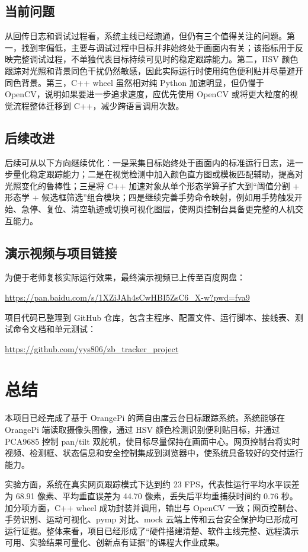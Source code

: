 \documentclass[
  oneside,
  degree=bachelor,
  field=science,
  fullwidthstop=circle,
  fontset=windows,
  times=false,
  minted=false,
  biblatex=false,
  algo=algpseudocode,
]{tongjithesis}
\begin{document}
\section{当前问题}

从回传日志和调试过程看，系统主线已经跑通，但仍有三个值得关注的问题。第一，找到率偏低，主要与调试过程中目标并非始终处于画面内有关；该指标用于反映完整调试过程，不单独代表目标持续可见时的稳定跟踪能力。第二，HSV 颜色跟踪对光照和背景同色干扰仍然敏感，因此实际运行时使用纯色便利贴并尽量避开同色背景。第三，C++ wheel 虽然相对纯 Python 加速明显，但仍慢于 OpenCV，说明如果要进一步追求速度，应优先使用 OpenCV 或将更大粒度的视觉流程整体迁移到 C++，减少跨语言调用次数。

\section{后续改进}

后续可从以下方向继续优化：一是采集目标始终处于画面内的标准运行日志，进一步量化稳定跟踪能力；二是在视觉检测中加入颜色直方图或模板匹配辅助，提高对光照变化的鲁棒性；三是将 C++ 加速对象从单个形态学算子扩大到“阈值分割 + 形态学 + 候选框筛选”组合模块；四是继续完善手势命令映射，例如用手势触发开始、急停、复位、清空轨迹或切换可视化图层，使网页控制台具备更完整的人机交互能力。

\section{演示视频与项目链接}

为便于老师复核实际运行效果，最终演示视频已上传至百度网盘：

\begin{center}
  \url{https://pan.baidu.com/s/1XZiJAh4sCwHBI5ZsC6_X-w?pwd=fva9}
\end{center}

项目代码已整理到 GitHub 仓库，包含主程序、配置文件、运行脚本、接线表、测试命令文档和单元测试：

\begin{center}
  \url{https://github.com/yys806/zb_tracker_project}
\end{center}

\chapter{总结}

本项目已经完成了基于 OrangePi 的两自由度云台目标跟踪系统。系统能够在 OrangePi 端读取摄像头图像，通过 HSV 颜色检测识别便利贴目标，并通过 PCA9685 控制 pan/tilt 双舵机，使目标尽量保持在画面中心。网页控制台将实时视频、检测框、状态信息和安全控制集成到浏览器中，使系统具备较好的交付运行能力。

实验方面，系统在真实网页跟踪模式下达到约 23 FPS，代表性运行平均水平误差为 68.91 像素、平均垂直误差为 44.70 像素，丢失后平均重捕获时间约 0.76 秒。加分项方面，C++ wheel 成功封装并调用，输出与 OpenCV 一致；网页控制台、手势识别、运动可视化、pymp 对比、mock 云端上传和云台安全保护均已形成可运行证据。整体来看，项目已经形成了“硬件搭建清楚、软件主线完整、远程演示可用、实验结果可量化、创新点有证据”的课程大作业成果。
\end{document}
